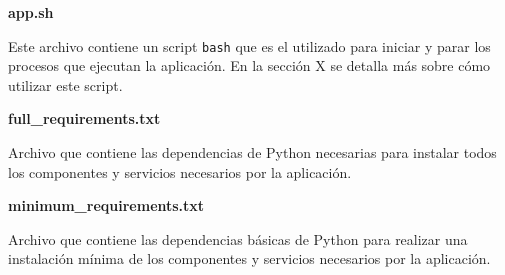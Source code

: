 \newpage

\textbf{app.sh}

Este archivo contiene un script \texttt{bash} que es el utilizado para iniciar y parar los procesos que ejecutan la aplicación. En la sección X se detalla más sobre cómo utilizar este script.

\textbf{full\_requirements.txt}

Archivo que contiene las dependencias de Python necesarias para instalar todos los componentes y servicios necesarios por la aplicación.

\textbf{minimum\_requirements.txt}

Archivo que contiene las dependencias básicas de Python para realizar una instalación mínima de los componentes y servicios necesarios por la aplicación.

